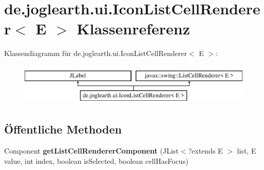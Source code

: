 \section{de.\-joglearth.\-ui.\-Icon\-List\-Cell\-Renderer$<$ E $>$ Klassenreferenz}
\label{classde_1_1joglearth_1_1ui_1_1_icon_list_cell_renderer_3_01_e_01_4}
Klassendiagramm für de.\-joglearth.\-ui.\-Icon\-List\-Cell\-Renderer$<$ E $>$\-:\begin{figure}[H]
\begin{center}
\leavevmode
\includegraphics[height=2.000000cm]{classde_1_1joglearth_1_1ui_1_1_icon_list_cell_renderer_3_01_e_01_4}
\end{center}
\end{figure}
\subsection*{Öffentliche Methoden}
\begin{DoxyCompactItemize}
\item 
Component {\bfseries get\-List\-Cell\-Renderer\-Component} (J\-List$<$?extends E $>$ list, E value, int index, boolean is\-Selected, boolean cell\-Has\-Focus)\label{classde_1_1joglearth_1_1ui_1_1_icon_list_cell_renderer_3_01_e_01_4_ac613890106639359ca31c02e1ea0b09b}

\end{DoxyCompactItemize}
